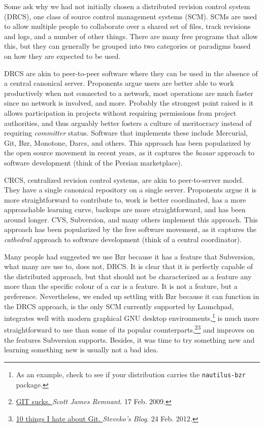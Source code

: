 
Some ask why we had not initially chosen a distributed revision control system (DRCS), one class of source control management systems (SCM). SCMs are used to allow multiple people to collaborate over a shared set of files, track revisions and logs, and a number of other things. There are many free programs that allow this, but they can generally be grouped into two categories or paradigms based on how they are expected to be used.

DRCS are akin to peer-to-peer software where they can be used in the absence of a central canonical server. Proponents argue users are better able to work productively when not connected to a network, most operations are much faster since no network is involved, and more. Probably the strongest point raised is it allows participation in projects without requiring permissions from project authorities, and thus arguably better fosters a culture of meritocracy instead of requiring {\it committer} status. Software that implements these include Mercurial, Git, Bzr, Monotone, Darcs, and others. This approach has been popularized by the open source movement in recent years, as it captures the {\it bazaar} approach to software development (think of the Persian marketplace).

CRCS, centralized revision control systems, are akin to peer-to-server model. They have a single canonical repository on a single server. Proponents argue it is more straightforward to contribute to, work is better coordinated, has a more approachable learning curve, backups are more straightforward, and has been around longer. CVS, Subversion, and many others implement this approach. This approach has been popularized by the free software movement, as it captures the {\it cathedral} approach to software development (think of a central coordinator).

Many people had suggested we use Bzr because it has a feature that Subversion, what many are use to, does not, DRCS. It is clear that it is perfectly capable of the distributed approach, but that should not be characterized as a feature any more than the specific colour of a car is a feature. It is not a feature, but a preference. Nevertheless, we ended up settling with Bzr because it can function in the DRCS approach, is the only SCM currently supported by Launchpad, integrates well with modern graphical GNU desktop environments,\footnote{As an example, check to see if your distribution carries the {\tt nautilus-bzr} package.} is much more straightforward to use than some of its popular counterparts,{\footnote{\href{http://netsplit.com/2009/02/17/git-sucks/}{GIT sucks. }{{\it Scott James Remnant}. 17 Feb. 2009.}}{\footnote{\href{https://steveko.wordpress.com/2012/02/24/10-things-i-hate-about-git/}{10 things I hate about Git. }{\it Steveko's Blog}. 24 Feb. 2012.}}} and improves on the features Subversion supports. Besides, it was time to try something new and learning something new is usually not a bad idea.

